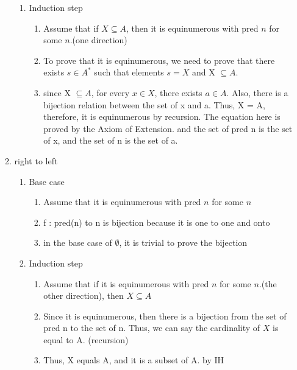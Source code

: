 \documentclass[10pt]{article}
\begin{document}
\begin{enumerate}
\begin{enumerate}
\begin{enumerate}
\begin{enumerate}
        \end{enumerate}
    \end{enumerate}
    \begin{enumerate}
        \item Induction step
        \begin{enumerate}
            \item Assume that if $X \subseteq A$, then it is equinumerous with pred $n$ for some $n$.(one direction)
            \item To prove that it is equinumerous, we need to prove that there exists $s \in A^*$ such that elements $s=X$ and X $ \subseteq A $.
            \item since X $\subseteq A$, for every $x \in X$, there exists $a \in A$. Also, there is a bijection relation between the set of x and a. Thus, X = A, therefore, it is equinumerous by recursion. The equation here is proved by the Axiom of Extension. and the set of pred n is the set of x, and the set of n is the set of a. 
        \end{enumerate}
    \end{enumerate}
    \item right to left
    \begin{enumerate}
        \item Base case 
        \begin{enumerate}
            \item Assume that it is equinumerous with pred $n$ for some $n$
            \item f : pred(n) to n is bijection because it is one to one and onto
            \item in the base case of $\emptyset$, it is trivial to prove the bijection
        \end{enumerate}
        \item Induction step
        \begin{enumerate}
            \item Assume that if it is equinumerous with pred $n$ for some $n$.(the other direction), then $X \subseteq A$ 
            \item Since it is equinumerous, then there is a bijection from the set of pred n to the set of n. Thus, we can say the cardinality of $X$ is equal to A. (recursion)
            \item Thus, X equals A, and it is a subset of A. by IH
        \end{enumerate}
    \end{enumerate}


\end{enumerate}
\end{enumerate}
\end{document}
